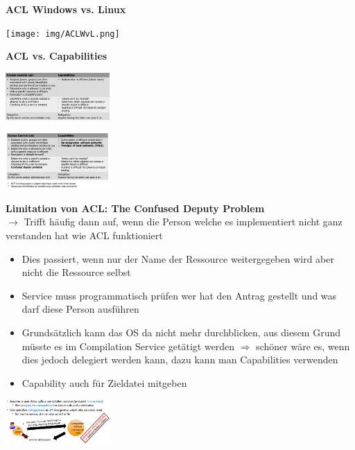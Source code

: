 \documentclass{report}
\newenvironment{Figure}
	{\par\medskip\noindent\minipage{\linewidth}}
	{\endminipage\par\medskip}
\theoremstyle{definition}
\theoremstyle{example}
\begin{document}
\textbf{ACL Windows vs. Linux}
\begin{Figure}
\centering
\texttt{[image: img/ACLWvL.png]}
	\label{fig:Abbildung ACL in Windows vs. Linux}
\end{Figure}

\textbf{ACL vs. Capabilities}
\begin{Figure}
\centering
\includegraphics[width=150px]{img/ACLvsCapI.png}
	\label{fig:Abbildung ACL vs. Capabilities Part 1}
\end{Figure}
\begin{Figure}
\centering
\includegraphics[width=150px]{img/ACLvsCapII.png}
	\label{fig:Abbildung ACL vs. Capabilities Part 2}
\end{Figure}

\textbf{Limitation von ACL: The Confused Deputy Problem}\\
$\rightarrow$ Trifft häufig dann auf, wenn die Person welche es implementiert nicht ganz verstanden hat wie ACL funktioniert
\begin{itemize}
	\item Dies passiert, wenn nur der Name der Ressource weitergegeben wird aber nicht die Ressource selbst
	\item Service muss programmatisch prüfen wer hat den Antrag gestellt und was darf diese Person ausführen
	\item Grundsätzlich kann das OS da nicht mehr durchblicken, aus diesem Grund müsste es im Compilation Service getätigt werden $\Rightarrow$ schöner wäre es, wenn dies jedoch delegiert werden kann, dazu kann man Capabilities verwenden
	\item Capability auch für Zieldatei mitgeben
\end{itemize}

\begin{Figure}
\centering
\includegraphics[width=150px]{img/confusedDeputyProblem.png}
	\label{fig:Abbildung des confused Deputy Problems}
\end{Figure}
\end{document}
